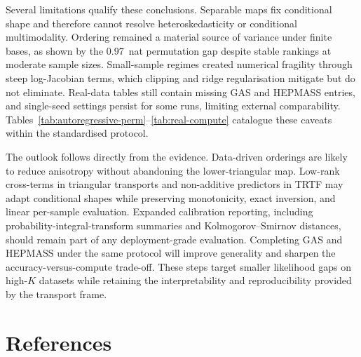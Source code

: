 \documentclass[11pt,a4paper,twoside]{book}\usepackage[]{graphicx}\usepackage[]{xcolor}
\begin{document}
Several limitations qualify these conclusions. Separable maps fix conditional shape and therefore cannot resolve heteroskedasticity or conditional multimodality. Ordering remained a material source of variance under finite bases, as shown by the $0.97$~nat permutation gap despite stable rankings at moderate sample sizes. Small-sample regimes created numerical fragility through steep log-Jacobian terms, which clipping and ridge regularisation mitigate but do not eliminate. Real-data tables still contain missing GAS and HEPMASS entries, and single-seed settings persist for some runs, limiting external comparability. Tables~\ref{tab:autoregressive-perm}--\ref{tab:real-compute} catalogue these caveats within the standardised protocol.

The outlook follows directly from the evidence. Data-driven orderings are likely to reduce anisotropy without abandoning the lower-triangular map. Low-rank cross-terms in triangular transports and non-additive predictors in TRTF may adapt conditional shapes while preserving monotonicity, exact inversion, and linear per-sample evaluation. Expanded calibration reporting, including probability-integral-transform summaries and Kolmogorov--Smirnov distances, should remain part of any deployment-grade evaluation. Completing GAS and HEPMASS under the same protocol will improve generality and sharpen the accuracy-versus-compute trade-off. These steps target smaller likelihood gaps on high-$K$ datasets while retaining the interpretability and reproducibility provided by the transport frame.





\chapter{References}\label{ch:refs}
\end{document}
